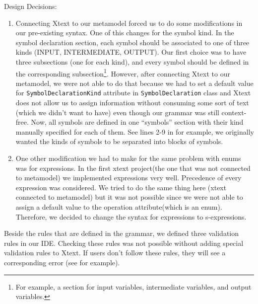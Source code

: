 \documentclass[11pt,fleqn]{article}
\begin{document}
\noindent{}Design Decisions:
\begin{enumerate}

  \item Connecting Xtext to our metamodel forced us to do some modifications in
        our pre-existing syntax. One of this changes for the symbol kind. In the
        symbol declaration section, each symbol should be associated to one of
        three kinds (INPUT, INTERMEDIATE, OUTPUT). Our first choice was to have
        three subsections (one for each kind), and every symbol should be
        defined in the corresponding subsection\footnote{For example, a section
        for input variables, intermediate variables, and output variables.}.
        However, after connecting Xtext to our metamodel, we were not able to do
        that because we had to set a default value for
        \lstinline{SymbolDeclarationKind} attribute in
        \lstinline{SymbolDeclaration} class and Xtext does not allow us to
        assign information without consuming some sort of text (which we didn't
        want to have) even though our grammar was still context-free. Now, all
        symbols are defined in one ``symbols'' section with their kind manually
        specified for each of them. See lines 2-9 in  for
        example, we originally wanted the kinds of symbols to be separated into
        blocks of symbols.
  
  \item One other modification we had to make for the same problem with enums
        was for expressions. In the first xtext project(the one that was not
        connected to metamodel) we implemented expressions very well. Precedence
        of every expression was considered. We tried to do the same thing here
        (xtext connected to metamodel) but it was not possible since we were not
        able to assign a default value to the operation attribute(which is an
        enum). Therefore, we decided to change the syntax for expressions to
        s-expressions.

\end{enumerate}
  
Beside the rules that are defined in the grammar, we defined three validation
rules in our IDE. Checking these rules was not possible without adding special
validation rules to Xtext. If users don't follow these rules, they will see a
corresponding error (see  for example).
\end{document}
